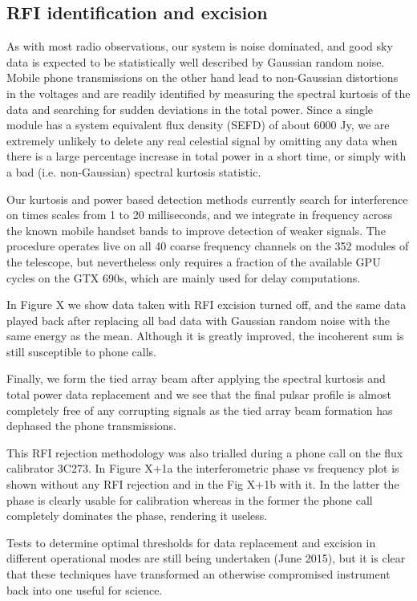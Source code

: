 \subsection{RFI identification and excision}

As with most radio observations, our system is noise dominated, and good sky data is expected to be statistically well described by Gaussian random noise. Mobile phone transmissions on the other hand lead to non-Gaussian distortions in the voltages and are readily identified by measuring the spectral kurtosis of the data and searching for sudden deviations in the total power. Since a single module has a system equivalent flux density (SEFD) of about 6000 Jy, we are extremely unlikely to delete any real celestial signal by omitting any data when there is a large percentage increase in total power in a short time, or simply with a bad (i.e. non-Gaussian) spectral kurtosis statistic. 

Our kurtosis and power based detection methods currently search for interference on times scales from 1 to 20 milliseconds, and we integrate in frequency across the known mobile handset bands to improve detection of weaker signals. The procedure operates live on all 40 coarse frequency channels on the 352 modules of the telescope, but nevertheless only requires a fraction of the available GPU cycles on the GTX 690s, which are mainly used for delay computations. 

In Figure X we show data taken with RFI excision turned off, and the same data played back after replacing all bad data with Gaussian random noise with the same energy as the mean. Although it is greatly improved, the incoherent sum is still susceptible to phone calls.

Finally, we form the tied array beam after applying the spectral kurtosis and total power data replacement and we see that the final pulsar profile is almost completely free of any corrupting signals as the tied array beam formation has dephased the phone transmissions.

This RFI rejection methodology was also trialled during a phone call on the flux calibrator 3C273. In Figure X+1a the interferometric phase vs frequency plot is shown without any RFI rejection and in the Fig X+1b with it. In the latter the phase is clearly usable for calibration whereas in the former the phone call completely dominates the phase, rendering it useless.

Tests to determine optimal thresholds for data replacement and excision in different operational modes are still being undertaken (June 2015), but it is clear that these techniques have transformed an otherwise compromised instrument back into one useful for science.

  